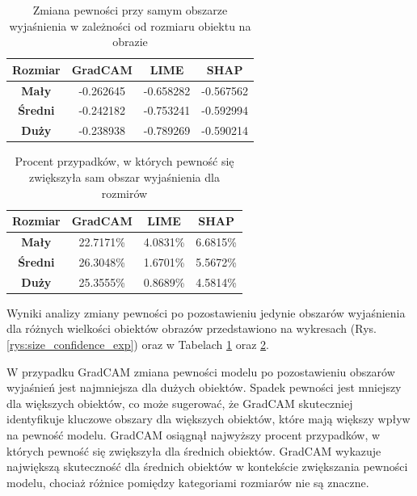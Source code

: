 \begin{table}[h]
	\centering
	\begin{tabular}{|c|c|c|c|}
		\hline
		\textbf{Rozmiar} & \textbf{GradCAM} & \textbf{LIME} & \textbf{SHAP} \\
		\hline
		\textbf{Mały}    & -0.262645        & -0.658282     & -0.567562     \\
		\hline
		\textbf{Średni}  & -0.242182        & -0.753241     & -0.592994     \\
		\hline
		\textbf{Duży}    & -0.238938        & -0.789269     & -0.590214     \\
		\hline
	\end{tabular}
	\caption{Zmiana pewności przy samym obszarze wyjaśnienia w zależności od rozmiaru obiektu na obrazie}
	\label{tab:size_confidence_exp}
\end{table}

\begin{table}[h]
	\centering
	\begin{tabular}{|c|c|c|c|}
		\hline
		\textbf{Rozmiar} & \textbf{GradCAM} & \textbf{LIME} & \textbf{SHAP} \\
		\hline
		\textbf{Mały}    & 22.7171\%        & 4.0831\%      & 6.6815\%      \\
		\hline
		\textbf{Średni}  & 26.3048\%        & 1.6701\%      & 5.5672\%      \\
		\hline
		\textbf{Duży}    & 25.3555\%        & 0.8689\%      & 4.5814\%      \\
		\hline
	\end{tabular}
	\caption{Procent przypadków, w których pewność się zwiększyła sam obszar wyjaśnienia dla rozmirów}
	\label{tab:size_confidence_exp_percent}
\end{table}

Wyniki analizy zmiany pewności po pozostawieniu jedynie obszarów wyjaśnienia dla różnych wielkości obiektów obrazów przedstawiono na wykresach (Rys. \ref{rys:size_confidence_exp}) oraz w Tabelach \ref{tab:size_confidence_exp} oraz \ref{tab:size_confidence_exp_percent}.

W przypadku GradCAM zmiana pewności modelu po pozostawieniu obszarów wyjaśnień jest najmniejsza dla dużych obiektów.
Spadek pewności jest mniejszy dla większych obiektów, co może sugerować, że GradCAM skuteczniej identyfikuje kluczowe obszary dla większych obiektów, które mają większy wpływ na pewność modelu.
GradCAM osiągnął najwyższy procent przypadków, w których pewność się zwiększyła dla średnich obiektów.
GradCAM wykazuje największą skuteczność dla średnich obiektów w kontekście zwiększania pewności modelu, chociaż różnice pomiędzy kategoriami rozmiarów nie są znaczne.

